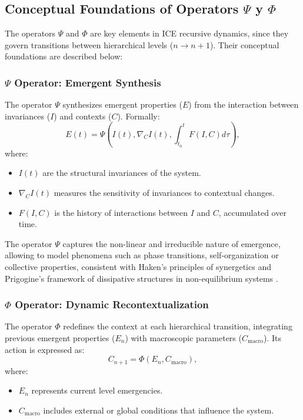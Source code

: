 \documentclass{article}
\begin{document}
\subsection{Conceptual Foundations of Operators \texorpdfstring{$\Psi$ y $\Phi$}{Psi y Phi}}
The operators $\Psi$ and $\Phi$ are key elements in ICE recursive dynamics, since they govern transitions between hierarchical levels ($n \to n+1$). Their conceptual foundations are described below:

\subsubsection{\texorpdfstring{$\Psi$}{Psi} Operator: Emergent Synthesis}
The operator $\Psi$ synthesizes emergent properties ($E$) from the interaction between invariances ($I$) and contexts ($C$). Formally:
\begin{equation}\label{eq:psi}
    E(t) = \Psi\left(I(t), \nabla_C I(t), \int_{t_0}^t F(I, C) d\tau\right),
\end{equation}
where:
\begin{itemize}
    \item $I(t)$ are the structural invariances of the system.
    \item $\nabla_C I(t)$ measures the sensitivity of invariances to contextual changes.
    \item $F(I, C)$ is the history of interactions between $I$ and $C$, accumulated over time.
\end{itemize}

The operator $\Psi$ captures the non-linear and irreducible nature of emergence, allowing to model phenomena such as phase transitions, self-organization or collective properties, consistent with Haken’s principles of synergetics \cite{Haken1983} and Prigogine’s framework of dissipative structures in non-equilibrium systems \cite{NicolisPrigogine1977}.

\subsubsection{\texorpdfstring{$\Phi$}{Phi} Operator: Dynamic Recontextualization}
The operator $\Phi$ redefines the context at each hierarchical transition, integrating previous emergent properties ($E_n$) with macroscopic parameters ($C_{\text{macro}}$). Its action is expressed as:
\begin{equation}\label{eq:phi}
    C_{n+1} = \Phi(E_n, C_{\text{macro}}),
\end{equation}
where:
\begin{itemize}
    \item $E_n$ represents current level emergencies.
    \item $C_{\text{macro}}$ includes external or global conditions that influence the system.
\end{itemize}
\end{document}
